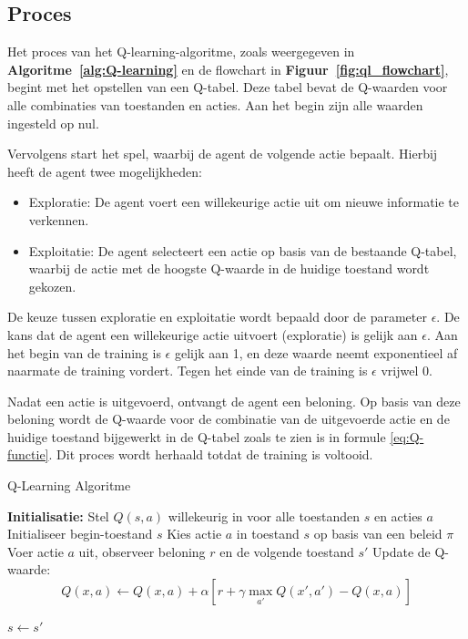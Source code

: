 \documentclass[a4paper,12pt]{report}
\begin{document}
\subsection{Proces}
Het proces van het Q-learning-algoritme, zoals weergegeven in
\textbf{Algoritme~\ref{alg:Q-learning}} en de flowchart in
\textbf{Figuur~\ref{fig:ql_flowchart}}, begint met het opstellen van een
Q-tabel. Deze tabel bevat de Q-waarden voor alle combinaties van toestanden en
acties. Aan het begin zijn alle waarden ingesteld op nul.

Vervolgens start het spel, waarbij de agent de volgende actie bepaalt. Hierbij
heeft de agent twee mogelijkheden:
\begin{itemize}
    \item Exploratie: De agent voert een willekeurige actie uit om nieuwe informatie te
          verkennen.
    \item Exploitatie: De agent selecteert een actie op basis van de bestaande Q-tabel,
          waarbij de actie met de hoogste Q-waarde in de huidige toestand wordt gekozen.
\end{itemize}

De keuze tussen exploratie en exploitatie wordt bepaald door de parameter
$\epsilon$. De kans dat de agent een willekeurige actie uitvoert (exploratie)
is gelijk aan $\epsilon$. Aan het begin van de training is $\epsilon$ gelijk
aan 1, en deze waarde neemt exponentieel af naarmate de training vordert. Tegen
het einde van de training is $\epsilon$ vrijwel 0.

Nadat een actie is uitgevoerd, ontvangt de agent een beloning. Op basis van
deze beloning wordt de Q-waarde voor de combinatie van de uitgevoerde actie en
de huidige toestand bijgewerkt in de Q-tabel zoals te zien is in formule
\eqref{eq:Q-functie}. Dit proces wordt herhaald totdat de training is voltooid.

\begin{algorithm}
    \caption{Q-Learning Algoritme}\label{alg:Q-learning}
    \begin{algorithmic}
        \State \textbf{Initialisatie:} Stel $Q(s, a)$ willekeurig in voor alle toestanden $s$ en acties $a$
        \State Initialiseer begin-toestand $s$
        \State Kies actie $a$ in toestand $s$ op basis van een beleid $\pi$
        \State Voer actie $a$ uit, observeer beloning $r$ en de volgende toestand $s'$
        \State Update de Q-waarde:
        \begin{equation} \label{eq:Q-functie}
            Q(x, a) \leftarrow Q(x, a) + \alpha \left[ r + \gamma \max_{a'} Q(x', a') - Q(x, a) \right]
        \end{equation}

        \State $s \gets s'$
        \EndWhile
        \EndFor
    \end{algorithmic}
\end{algorithm}
\end{document}

